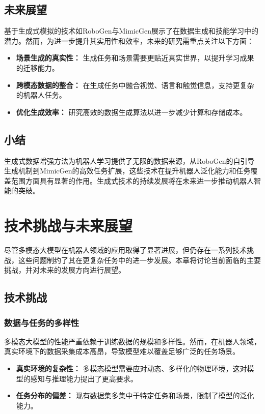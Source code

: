 \documentclass[a4paper]{article}
\begin{document}
\subsection{未来展望}
基于生成式模拟的技术如RoboGen与MimicGen展示了在数据生成和技能学习中的潜力。然而，为进一步提升其实用性和效率，未来的研究需重点关注以下方面：
\begin{itemize}
    \item \textbf{场景生成的真实性：} 生成任务和场景需要更贴近真实世界，以提升学习成果的迁移能力。
    \item \textbf{跨模态数据的整合：} 在生成任务中融合视觉、语言和触觉信息，支持更复杂的机器人任务。
    \item \textbf{优化生成效率：} 研究高效的数据生成算法以进一步减少计算和存储成本。
\end{itemize}

\subsection{小结}
生成式数据增强方法为机器人学习提供了无限的数据来源，从RoboGen的自引导生成机制到MimicGen的高效任务扩展，这些技术在提升机器人泛化能力和任务覆盖范围方面具有显著的作用\cite{wang2023robogen, mandlekar2023mimicgen}。生成式技术的持续发展将在未来进一步推动机器人智能的突破。

\section{技术挑战与未来展望}

尽管多模态大模型在机器人领域的应用取得了显著进展，但仍存在一系列技术挑战，这些问题制约了其在更复杂任务中的进一步发展。本章将讨论当前面临的主要挑战，并对未来的发展方向进行展望。

\subsection{技术挑战}
\subsubsection{数据与任务的多样性}
多模态大模型的性能严重依赖于训练数据的规模和多样性。然而，在机器人领域，真实环境下的数据采集成本高昂，导致模型难以覆盖足够广泛的任务场景\cite{chi2024universal, mandlekar2023mimicgen}。
\begin{itemize}
    \item \textbf{真实环境的复杂性：} 多模态模型需要应对动态、多样化的物理环境，这对模型的感知与推理能力提出了更高要求。
    \item \textbf{任务分布的偏差：} 现有数据集多集中于特定任务和场景，限制了模型的泛化能力。
\end{itemize}
\end{document}
